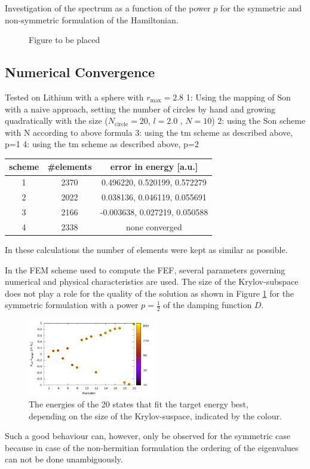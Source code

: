 Investigation of the spectrum as a function of the power $p$ for the symmetric and non-symmetric formulation of the Hamiltonian.
\begin{figure}
\caption{Figure to be placed}
\end{figure}

\subsection{Numerical Convergence}
Tested on Lithium with a sphere with $r_\text{max}=2.8$
1:  Using the mapping of Son with a naive approach, setting the number of circles by hand and growing quadratically with the size  ($N_\text{circle}=20$, $l= 2.0$ , $N= 10$)
2: using the Son scheme with N according to above formula
3: using the tm scheme as described above, p=1
4: using the tm scheme as described above, p=2

\begin{tabular}{|c|c|c|}
\hline
scheme & \#elements & error in energy [a.u.]\\
\hline
1      & 2370      & 0.496220, 0.520199, 0.572279 \\
2      & 2022      & 0.038136, 0.046119, 0.055691 \\
3      & 2166      &-0.003638, 0.027219, 0.050588 \\
4      & 2338      & none converged \\
\hline
\end{tabular}
In these calculations the number of elements were kept as similar as possible.

In the FEM scheme used to compute the FEF, several parameters governing numerical and physical characteristics are used.
The size of the Krylov-subspace does not play a role for the quality of the solution as shown in Figure \ref{fig:E_nev} for the symmetric formulation with a power $p=\frac 12$ of the damping function $D$.
\begin{figure}
\includegraphics[width=0.5\textwidth]{Figures/Root_E_nev.pdf}
\caption{The energies of the 20 states that fit the target energy best, depending on the
size of the Krylov-suspace, indicated by the colour.}
\label{fig:E_nev}
\end{figure}
Such a good behaviour can, however, only be observed for the symmetric case because in case of the non-hermitian formulation the ordering of the eigenvalues can not be done unambiguously.

